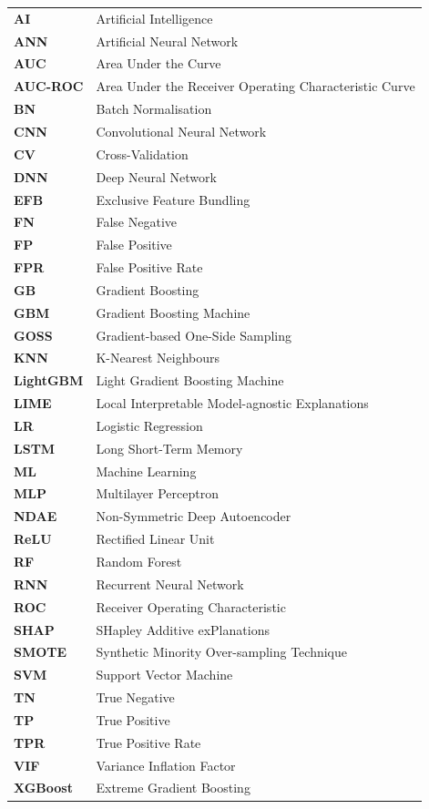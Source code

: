 \begin{longtable}{>{\bfseries}p{3.6cm} p{10.4cm}}
AI         & Artificial Intelligence \\
ANN        & Artificial Neural Network \\
AUC        & Area Under the Curve \\
AUC-ROC    & Area Under the Receiver Operating Characteristic Curve \\
BN         & Batch Normalisation \\
CNN        & Convolutional Neural Network \\
CV         & Cross-Validation \\
DNN        & Deep Neural Network \\
EFB        & Exclusive Feature Bundling \\
FN         & False Negative \\
FP         & False Positive \\
FPR        & False Positive Rate \\
GB         & Gradient Boosting \\
GBM        & Gradient Boosting Machine \\
GOSS       & Gradient-based One-Side Sampling \\
KNN        & K-Nearest Neighbours \\
LightGBM   & Light Gradient Boosting Machine \\
LIME       & Local Interpretable Model-agnostic Explanations \\
LR         & Logistic Regression \\
LSTM       & Long Short-Term Memory \\
ML         & Machine Learning \\
MLP        & Multilayer Perceptron \\
NDAE       & Non-Symmetric Deep Autoencoder \\
ReLU       & Rectified Linear Unit \\
RF         & Random Forest \\
RNN        & Recurrent Neural Network \\
ROC        & Receiver Operating Characteristic \\
SHAP       & SHapley Additive exPlanations \\
SMOTE      & Synthetic Minority Over-sampling Technique \\
SVM        & Support Vector Machine \\
TN         & True Negative \\
TP         & True Positive \\
TPR        & True Positive Rate \\
VIF        & Variance Inflation Factor \\
XGBoost    & Extreme Gradient Boosting \\

\end{longtable}
